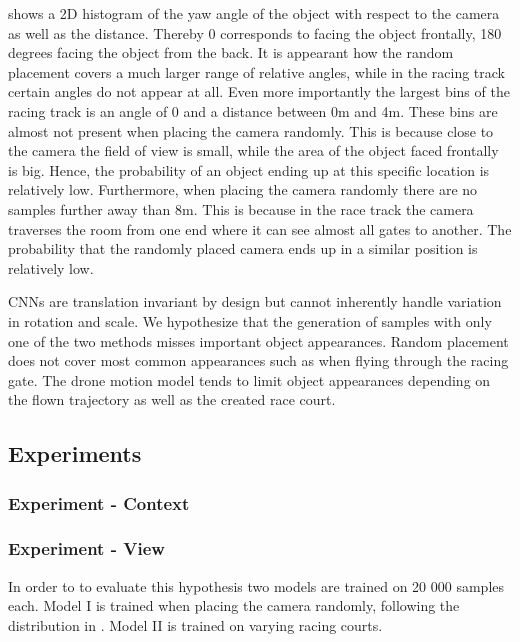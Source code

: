 	 shows a 2D histogram of the yaw angle of the object with respect to the camera as well as the distance. Thereby 0 corresponds to facing the object frontally, 180 degrees facing the object from the back. It is appearant how the random placement covers a much larger range of relative angles, while in the racing track certain angles do not appear at all. Even more importantly the largest bins of the racing track is an angle of 0 and a distance between 0m and 4m. These bins are almost not present when placing the camera randomly. This is because close to the camera the field of view is small, while the area of the object faced frontally is big. Hence, the probability of an object ending up at this specific location is relatively low. Furthermore, when placing the camera randomly there are no samples further away than 8m. This is because in the race track the camera traverses the room from one end where it can see almost all gates to another. The probability that the randomly placed camera ends up in a similar position is relatively low.
	
	\acp{CNN} are translation invariant by design but cannot inherently handle variation in rotation and scale. We hypothesize that the generation of samples with only one of the two methods misses important object appearances. Random placement does not cover most common appearances such as when flying through the racing gate. The drone motion model tends to limit object appearances depending on the flown trajectory as well as the created race court. 
	
	\subsection{Experiments}
	
	\subsubsection{Experiment - Context}
	
	\subsubsection{Experiment - View}
	
	
	In order to to evaluate this hypothesis two models are trained on 20 000 samples each. Model I is trained when placing the camera randomly, following the distribution in . Model II is trained on varying racing courts. 
	
